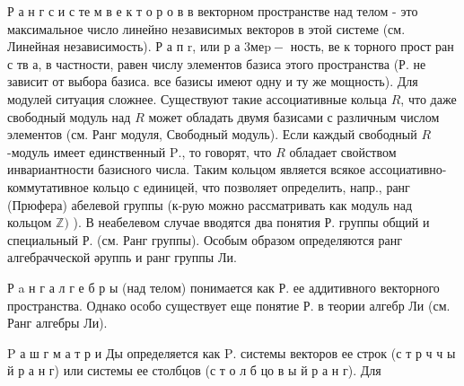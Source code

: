 \documentclass[10pt]{article}
\begin{document}
Р а н г с и с те м в е к т о р о в в векторном пространстве над телом - это максимальное число линейно независимых векторов в этой системе (см. Линейная независимость). Р а п $\mathrm{r}$, или р а $3 \mathrm{м} \mathrm{е} \mathrm{p-}$ ность, ве к торного прост ран с тв а, в частности, равен числу элементов базиса этого пространства (Р. не зависит от выбора базиса. все базисы имеют одну и ту же мощность). Для модулей ситуация сложнее. Существуют такие ассоциативные кольца $R$, что даже свободный модуль над $R$ может обладать двумя базисами с различным числом элементов (см. Ранг модуля, Свободный модуль). Если каждый свободный $R$-модуль имеет единственный $\mathrm{P}$., то говорят, что $R$ обладает свойством инвариантности базисного числа. Таким кольцом является всякое ассоциативно-коммутативное кольцо с единицей, что позволяет определить, напр., ранг (Прюфера) абелевой группы (к-рую можно рассматривать как модуль над кольцом $\mathbb{Z})$ ). В неабелевом случае вводятся два понятия Р. группы общий и специальный Р. (см. Ранг группы). Особым образом определяются ранг алгебрачческой әруппь и ранг группы Ли.



Р a н г а л г е б р ы (над телом) понимается как Р. ее аддитивного векторного пространства. Однако особо существует еще понятие Р. в теории алгебр Ли (см. Ранг алгебры Ли).



P а ш г м а т р и Ды определяется как $\mathrm{P}$. системы векторов ее строк (с т р ч ч ы й р а н г) или системы ее столбцов (с т о л б цо в ы й р а н г). Для
\end{document}
